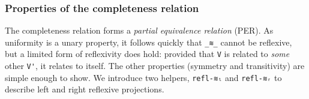 \documentclass[authoryear, acmsmall, screen, review, nonacm]{acmart}
\begin{document}
\subsubsection{Properties of the completeness relation}

The completeness relation forms a \emph{partial equivalence relation} (PER). As uniformity is a unary property, it follows quickly that \verb!_≋_! cannot be reflexive, but a limited form of reflexivity does hold: provided that \verb!V! is related to \emph{some} other \verb!V'!, it relates to itself. The other properties (symmetry and transitivity) are simple enough to show. We introduce two helpers, \verb!refl-≋ₗ! and \verb!refl-≋ᵣ! to describe left and right reflexive projections.

\begin{code}%
\>[0]\AgdaSpace{}%
\AgdaSymbol{:}\AgdaSpace{}%
\AgdaSpace{}%
\AgdaSymbol{\{}\AgdaSpace{}%
\AgdaSpace{}%
\AgdaSymbol{:}\AgdaSpace{}%
\AgdaSpace{}%
\AgdaSpace{}%
\AgdaSymbol{\}}%
\>[38]\AgdaSpace{}%
\AgdaSpace{}%
\AgdaSpace{}%
\AgdaSpace{}%
\AgdaSpace{}%
\AgdaSpace{}%
\AgdaSpace{}%
\<%
\\
\>[0]\AgdaSpace{}%
\AgdaSymbol{:}\AgdaSpace{}%
\AgdaSpace{}%
\AgdaSymbol{\{}\AgdaSpace{}%
\AgdaSpace{}%
\AgdaSymbol{:}\AgdaSpace{}%
\AgdaSpace{}%
\AgdaSpace{}%
\AgdaSymbol{\}}%
\>[38]\AgdaSpace{}%
\AgdaSpace{}%
\AgdaSpace{}%
\AgdaSpace{}%
\AgdaSpace{}%
\AgdaSpace{}%
\AgdaSpace{}%
\<%
\\
\>[0]\AgdaSpace{}%
\AgdaSymbol{:}\AgdaSpace{}%
\AgdaSpace{}%
\AgdaSymbol{\{}\AgdaSpace{}%
\AgdaSpace{}%
\AgdaSymbol{:}\AgdaSpace{}%
\AgdaSpace{}%
\AgdaSpace{}%
\AgdaSymbol{\}}%
\>[37]\AgdaSpace{}%
\AgdaSpace{}%
\AgdaSpace{}%
\AgdaSpace{}%
\AgdaSpace{}%
\AgdaSpace{}%
\AgdaSpace{}%
\<%

\end{code}
\end{document}
